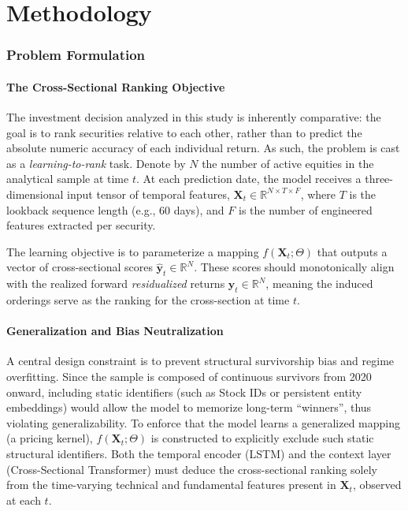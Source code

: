 
\part{Methodology} \label{part:methodology}
\section{Problem Formulation} \label{sec:problem-formulation}
\subsection*{The Cross-Sectional Ranking Objective}

The investment decision analyzed in this study is inherently comparative: the goal is to rank securities relative to each other, rather than to predict the absolute numeric accuracy of each individual return. As such, the problem is cast as a \emph{learning-to-rank} task. Denote by $N$ the number of active equities in the analytical sample at time $t$. At each prediction date, the model receives a three-dimensional input tensor of temporal features, $\mathbf{X}_t \in \mathbb{R}^{N \times T \times F}$, where $T$ is the lookback sequence length (e.g., 60 days), and $F$ is the number of engineered features extracted per security.

The learning objective is to parameterize a mapping $f(\mathbf{X}_t; \Theta)$ that outputs a vector of cross-sectional scores $\mathbf{\hat{y}}_t \in \mathbb{R}^N$. These scores should monotonically align with the realized forward \emph{residualized} returns $\mathbf{y}_t \in \mathbb{R}^N$, meaning the induced orderings serve as the ranking for the cross-section at time $t$.

\subsection*{Generalization and Bias Neutralization}
A central design constraint is to prevent structural survivorship bias and regime overfitting. Since the sample is composed of continuous survivors from 2020 onward, including static identifiers (such as Stock IDs or persistent entity embeddings) would allow the model to memorize long-term “winners”, thus violating generalizability. To enforce that the model learns a generalized mapping (a pricing kernel), $f(\mathbf{X}_t; \Theta)$ is constructed to explicitly exclude such static structural identifiers. Both the temporal encoder (\acs{LSTM}) and the context layer (Cross-Sectional Transformer) must deduce the cross-sectional ranking solely from the time-varying technical and fundamental features present in $\mathbf{X}_t$, observed at each $t$.


